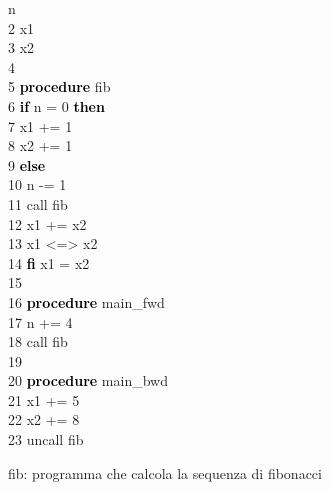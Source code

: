 \documentclass{article}
\theoremstyle{plain}
\theoremstyle{definition}
\theoremstyle{plain}
\newcommand{\kw}[1]{\textcolor{black}{\textbf{#1}}}
\begin{document}
\begin{figure}[h]
    \centering
    \begin{minipage}{0.95\textwidth}
         \hspace*{5em}n\\
        2 \hspace*{5em}x1\\
        3 \hspace*{5em}x2\\
        4 \\
        5 \hspace*{5em}\kw{procedure} fib \\
        6 \hspace*{6em} \kw{if} n = 0 \kw{then} \\
        7 \hspace*{13em} x1 += 1 \\
        8 \hspace*{13em} x2 += 1 \\
        9 \hspace*{11em} \kw{else} \\
        10 \hspace*{13em} n -= 1 \\
        11 \hspace*{13em} call fib \\
        12 \hspace*{13em} x1 += x2 \\
        13 \hspace*{13em} x1 <=> x2 \\
        14 \hspace*{6em} \kw{fi} x1 = x2 \\
        15 \\
        16 \hspace*{5em}\kw{procedure} main\_fwd \\
        17 \hspace*{6em} n += 4 \\
        18 \hspace*{6em} call fib \\
        19 \\
        20 \hspace*{5em}\kw{procedure} main\_bwd \\
        21 \hspace*{6em} x1 += 5 \\
        22 \hspace*{6em} x2 += 8 \\
        23 \hspace*{6em} uncall fib \\
    \end{minipage}
    \caption{fib: programma che calcola la sequenza di fibonacci}
    \label{fig:program}
\end{figure}
\end{document}
